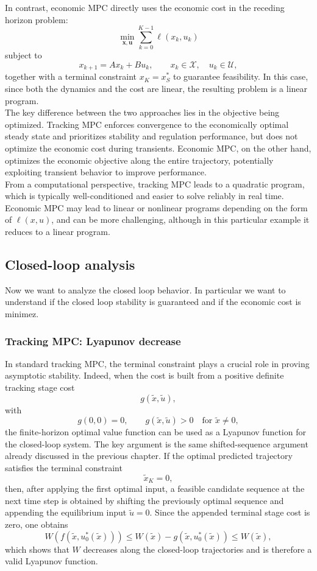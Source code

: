 In contrast, economic MPC directly uses the economic cost in the receding horizon problem:
\[
\min_{\mathbf{x},\mathbf{u}} \sum_{k=0}^{K-1} \ell(x_k,u_k)
\]
subject to
\[
x_{k+1} = A x_k + B u_k, \qquad x_k \in \mathcal{X}, \quad u_k \in \mathcal{U},
\]
together with a terminal constraint $x_K = x_S^*$ to guarantee feasibility. In this case, since both the dynamics and the cost are linear, the resulting problem is a linear program.\\

The key difference between the two approaches lies in the objective being optimized. Tracking MPC enforces convergence to the economically optimal steady state and prioritizes stability and regulation performance, but does not optimize the economic cost during transients. Economic MPC, on the other hand, optimizes the economic objective along the entire trajectory, potentially exploiting transient behavior to improve performance.\\

From a computational perspective, tracking MPC leads to a quadratic program, which is typically well-conditioned and easier to solve reliably in real time. Economic MPC may lead to linear or nonlinear programs depending on the form of $\ell(x,u)$, and can be more challenging, although in this particular example it reduces to a linear program.
\subsection{Closed-loop analysis}
Now we want to analyze the closed loop behavior. In particular we want to understand if the closed loop stability is guaranteed and if the economic cost is minimez.
\subsubsection{Tracking MPC: Lyapunov decrease}
In standard tracking MPC, the terminal constraint plays a crucial role in proving asymptotic stability. Indeed, when the cost is built from a positive definite tracking stage cost
\[
g(\tilde{x},\tilde{u}),
\]
with
\[
g(0,0)=0, \qquad g(\tilde{x},\tilde{u})>0 \quad \text{for } \tilde{x}\neq 0,
\]
the finite-horizon optimal value function can be used as a Lyapunov function for the closed-loop system. The key argument is the same shifted-sequence argument already discussed in the previous chapter. If the optimal predicted trajectory satisfies the terminal constraint
\[
\tilde{x}_K = 0,
\]
then, after applying the first optimal input, a feasible candidate sequence at the next time step is obtained by shifting the previously optimal sequence and appending the equilibrium input $\tilde{u}=0$. Since the appended terminal stage cost is zero, one obtains
\[
W(f(\tilde{x},u_0^*(\tilde{x}))) \leq W(\tilde{x}) - g(\tilde{x},u_0^*(\tilde{x})) \leq W(\tilde{x}),
\]
which shows that $W$ decreases along the closed-loop trajectories and is therefore a valid Lyapunov function.
